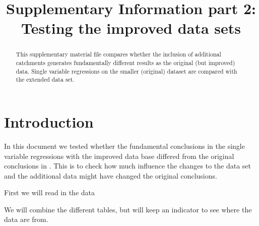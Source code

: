 \documentclass[]{elsarticle} %
\newenvironment{Shaded}{\begin{snugshade}}{\end{snugshade}}
\newcommand{\AttributeTok}[1]{\textcolor[rgb]{0.77,0.63,0.00}{#1}}
\newcommand{\FunctionTok}[1]{\textcolor[rgb]{0.00,0.00,0.00}{#1}}
\newcommand{\NormalTok}[1]{#1}
\newcommand{\OtherTok}[1]{\textcolor[rgb]{0.56,0.35,0.01}{#1}}
\newcommand{\SpecialCharTok}[1]{\textcolor[rgb]{0.00,0.00,0.00}{#1}}
\newcommand{\StringTok}[1]{\textcolor[rgb]{0.31,0.60,0.02}{#1}}
\begin{document}
\begin{frontmatter}

  \title{Supplementary Information part 2: Testing the improved data sets}
    \author[]{%
  }
  
  
  \begin{abstract}
  This supplementary material file compares whether the inclusion of additional catchments generates fundamentally different results as the original (but improved) data. Single variable regressions on the smaller (original) dataset are compared with the extended data set.
  \end{abstract}
  
 \end{frontmatter}

\hypertarget{introduction}{%
\section{Introduction}\label{introduction}}

In this document we tested whether the fundamental conclusions in the single variable regressions with the improved data base differed from the original conclusions in \citet{zhang2017}. This is to check how much influence the changes to the data set and the additional data might have changed the original conclusions.

First we will read in the data

We will combine the different tables, but will keep an indicator to see where the data are from.

\begin{Shaded}
\end{Shaded}
\end{document}
